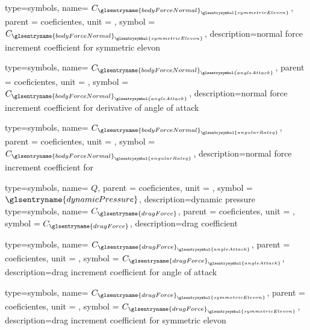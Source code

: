 {type=symbols,
    name= \ensuremath{C_{{\glsentryname{bodyForceNormal}}_{\glsentrysymbol{symmetricElevon}}}},
    parent = {coeficientes},
    unit = \unexpanded{},
    symbol = \ensuremath{C_{{\glsentryname{bodyForceNormal}}_{\glsentrysymbol{symmetricElevon}}}},
    description={normal force increment coefficient for symmetric elevon}
}

{type=symbols,
    name= \ensuremath{C_{{\glsentryname{bodyForceNormal}}_{\dot{\glsentrysymbol{angleAttack}}}}},
    parent = {coeficientes},
    unit = \unexpanded{},
    symbol = \ensuremath{C_{{\glsentryname{bodyForceNormal}}_{\dot{\glsentrysymbol{angleAttack}}}}},
    description={normal force increment coefficient for derivative of angle of attack}
}

{type=symbols,
    name= \ensuremath{C_{{\glsentryname{bodyForceNormal}}_{\glsentrysymbol{angularRateq}}}},
    parent = {coeficientes},
    unit = \unexpanded{},
    symbol = \ensuremath{C_{{\glsentryname{bodyForceNormal}}_{\glsentrysymbol{angularRateq}}}},
    description={normal force increment coefficient for }
}






{type=symbols,
    name= \ensuremath{Q},
    parent = {coeficientes},
    unit = \unexpanded{\si{\newton\per\cubic\meter}},
    symbol = \ensuremath{\glsentryname{dynamicPressure}},
    description={dynamic pressure}
}
{type=symbols,
    name= \ensuremath{C_{\glsentryname{dragForce}}},
    parent = {coeficientes},
    unit = \unexpanded{},
    symbol = \ensuremath{C_{\glsentryname{dragForce}}},
    description={drag coefficient}
}

{type=symbols,
    name= \ensuremath{C_{{\glsentryname{dragForce}}_{\glsentrysymbol{angleAttack}}}},
    parent = {coeficientes},
    unit = \unexpanded{},
    symbol = \ensuremath{C_{{\glsentryname{dragForce}}_{\glsentrysymbol{angleAttack}}}},
    description={drag increment coefficient for angle of attack}
}

{type=symbols,
    name= \ensuremath{C_{{\glsentryname{dragForce}}_{\glsentrysymbol{symmetricElevon}}}},
    parent = {coeficientes},
    unit = \unexpanded{},
    symbol = \ensuremath{C_{{\glsentryname{dragForce}}_{\glsentrysymbol{symmetricElevon}}}},
    description={drag increment coefficient for symmetric elevon}
}

